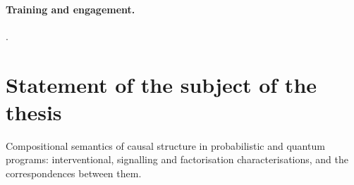 \paragraph{Training and engagement.} .

\section{Statement of the subject of the thesis}

Compositional semantics of causal structure in probabilistic and quantum programs: interventional, signalling and factorisation characterisations, and the correspondences between them.

